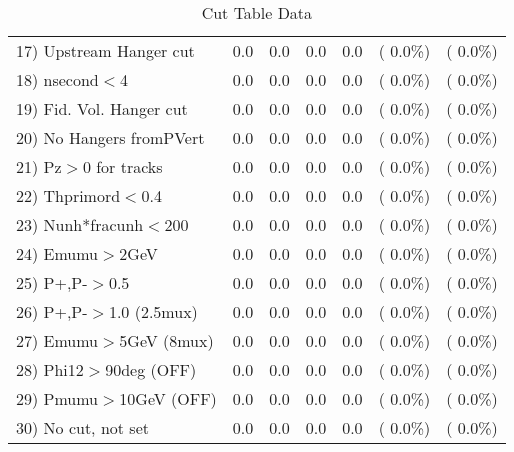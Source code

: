 \begin{table}[h!]
\begin{tabular}{||l||r|r|r|r|r|r||}
 17) Upstream Hanger cut  &          0.0 &          0.0 &          0.0 &          0.0 & (  0.0\%) & (  0.0\%) \\
 18) nsecond$<$4          &          0.0 &          0.0 &          0.0 &          0.0 & (  0.0\%) & (  0.0\%) \\
 19) Fid. Vol. Hanger cut &          0.0 &          0.0 &          0.0 &          0.0 & (  0.0\%) & (  0.0\%) \\
 20) No Hangers fromPVert &          0.0 &          0.0 &          0.0 &          0.0 & (  0.0\%) & (  0.0\%) \\
 21) Pz$>$0 for tracks    &          0.0 &          0.0 &          0.0 &          0.0 & (  0.0\%) & (  0.0\%) \\
 22) Thprimord$<$0.4      &          0.0 &          0.0 &          0.0 &          0.0 & (  0.0\%) & (  0.0\%) \\
 23) Nunh*fracunh$<$200   &          0.0 &          0.0 &          0.0 &          0.0 & (  0.0\%) & (  0.0\%) \\
 24) Emumu$>$2GeV         &          0.0 &          0.0 &          0.0 &          0.0 & (  0.0\%) & (  0.0\%) \\
 25) P+,P-$>$0.5          &          0.0 &          0.0 &          0.0 &          0.0 & (  0.0\%) & (  0.0\%) \\
 26) P+,P-$>$1.0 (2.5mux) &          0.0 &          0.0 &          0.0 &          0.0 & (  0.0\%) & (  0.0\%) \\
 27) Emumu$>$5GeV  (8mux) &          0.0 &          0.0 &          0.0 &          0.0 & (  0.0\%) & (  0.0\%) \\
 28) Phi12$>$90deg  (OFF) &          0.0 &          0.0 &          0.0 &          0.0 & (  0.0\%) & (  0.0\%) \\
 29) Pmumu$>$10GeV  (OFF) &          0.0 &          0.0 &          0.0 &          0.0 & (  0.0\%) & (  0.0\%) \\
 30) No cut, not set      &          0.0 &          0.0 &          0.0 &          0.0 & (  0.0\%) & (  0.0\%) \\
 \hline
 \hline
 \end{tabular}
 \caption{Cut Table  Data     }
 \label{tab-cutcohjpsi-mumu_data}
 \end{table}
